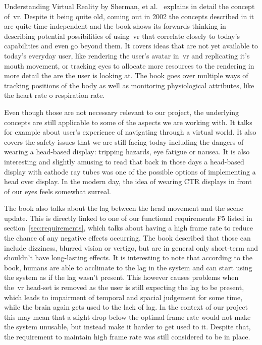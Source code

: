 Understanding Virtual Reality by Sherman, et al.~\cite{sherman2003} explains in detail the concept of~\acrfull{vr}. Despite it being quite old, coming out in 2002 the concepts described in it are quite time independent and the book shows its forwards thinking in describing potential possibilities of using~\acrshort{vr} that correlate closely to today's capabilities and even go beyond them. It covers ideas that are not yet available to today's everyday user, like rendering the user's avatar in~\acrshort{vr} and replicating it's mouth movement, or tracking eyes to allocate more resources to the rendering in more detail the are the user is looking at. The book goes over multiple ways of tracking positions of the body as well as monitoring physiological attributes, like the heart rate o respiration rate.

Even though those are not necessary relevant to our project, the underlying concepts are still applicable to some of the aspects we are working with. It talks for example about user's experience of navigating through a virtual world. It also covers the safety issues that we are still facing today including the dangers of wearing a head-based display: tripping hazards, eye fatigue or nausea. It is also interesting and slightly amusing to read that back in those days a head-based display with cathode ray tubes was one of the possible options of implementing a head over display. In the modern day, the idea of wearing CTR displays in front of our eyes feels somewhat surreal.

The book also talks about the lag between the head movement and the scene update. This is directly linked to one of our functional requirements F5 listed in section~\ref{sec:requirements}, which talks about having a high frame rate to reduce the chance of any negative effects occurring. The book described that those can include dizziness, blurred vision or vertigo, but are in general only short-term and shouldn't have long-lasting effects. It is interesting to note that according to the book, humans are able to acclimate to the lag in the system and can start using the system as if the lag wasn't present. This however causes problems when the~\acrshort{vr} head-set is removed as the user is still expecting the lag to be present, which leads to impairment of temporal and spacial judgement for some time, while the brain again gets used to the lack of lag. In the context of our project this may mean that a slight drop below the optimal frame rate would not make the system unusable, but instead make it harder to get used to it. Despite that, the requirement to maintain high frame rate was still considered to be in place.

